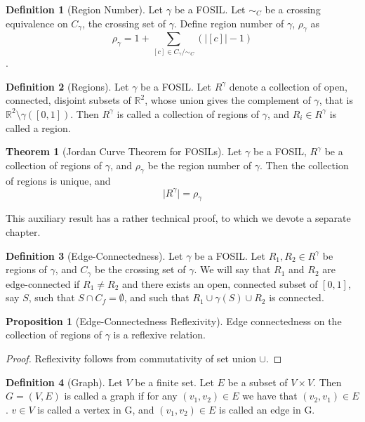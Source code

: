 \documentclass{article}
\theoremstyle{definition}
\newtheorem{definition}{Definition}
\theoremstyle{proposition}
\newtheorem{proposition}{Proposition}
\theoremstyle{theorem}
\newtheorem{theorem}{Theorem}
\begin{document}
\begin{definition}[Region Number]
Let $\gamma$ be a FOSIL. Let $\sim_{C}$ be a crossing equivalence on $C_{\gamma}$, the crossing set of $\gamma$. Define region number of $\gamma$, $\rho_{\gamma}$ as $$\rho_{\gamma} = 1 + \sum_{[c]\in C_{\gamma}/\sim_{C}}{(\lvert[c]\rvert - 1)}$$.
\end{definition}

\begin{definition}[Regions]
Let $\gamma$ be a FOSIL. Let $R^{\gamma}$ denote a collection of open, connected, disjoint subsets of $\mathbb{R}^{2}$, whose union gives the complement of $\gamma$, that is $\mathbb{R}^{2}\setminus\gamma([0,1])$. Then $R^{\gamma}$ is called a collection of regions of $\gamma$, and $R_{i} \in R^{\gamma}$ is called a region.
\end{definition}

\begin{theorem}[Jordan Curve Theorem for FOSILs]
Let $\gamma$ be a FOSIL, $R^{\gamma}$ be a collection of regions of $\gamma$, and $\rho_{\gamma}$ be the region number of $\gamma$. Then the collection of regions is unique, and $$\lvert R^{\gamma}\rvert = \rho_{\gamma}$$
\end{theorem}

This auxiliary result has a rather technical proof, to which we devote a separate chapter.

\begin{definition}[Edge-Connectedness]
Let $\gamma$ be a FOSIL. Let $R_{1}, R_{2} \in R^{\gamma}$ be regions of $\gamma$, and $C_{\gamma}$ be the crossing set of $\gamma$. We will say that $R_{1}$ and $R_{2}$ are edge-connected if $R_{1} \neq R_{2}$ and there exists an open, connected subset of $[0, 1]$, say $S$, such that $S \cap C_{f} = \emptyset$, and such that $R_{1} \cup \gamma(S) \cup R_{2}$ is connected.
\end{definition}

\begin{proposition}[Edge-Connectedness Reflexivity]
Edge connectedness on the collection of regions of $\gamma$ is a reflexive relation.
\end{proposition}

\begin{proof}
Reflexivity follows from commutativity of set union $\cup$.
\end{proof}

\begin{definition}[Graph]
Let $V$ be a finite set. Let $E$ be a subset of $V\times V$. Then $G=(V, E)$ is called a graph if for any $(v_{1}, v_{2}) \in E$ we have that $(v_{2}, v_{1}) \in E$. $v \in V$ is called a vertex in G, and $(v_{1}, v_{2}) \in E$ is called an edge in G.
\end{definition}
\end{document}
